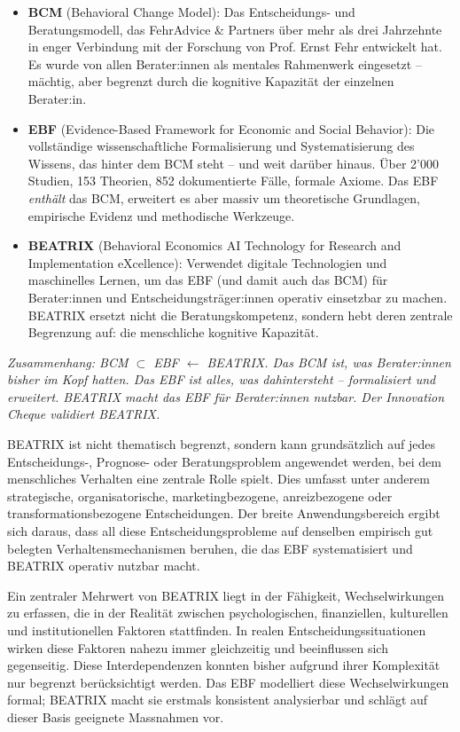\documentclass[11pt,a4paper]{article}
\begin{document}
\begin{itemize}[nosep]
    \item \textbf{BCM} (Behavioral Change Model): Das Entscheidungs- und Beratungsmodell, das FehrAdvice \& Partners über mehr als drei Jahrzehnte in enger Verbindung mit der Forschung von Prof. Ernst Fehr entwickelt hat. Es wurde von allen Berater:innen als mentales Rahmenwerk eingesetzt -- mächtig, aber begrenzt durch die kognitive Kapazität der einzelnen Berater:in.
    \item \textbf{EBF} (Evidence-Based Framework for Economic and Social Behavior): Die vollständige wissenschaftliche Formalisierung und Systematisierung des Wissens, das hinter dem BCM steht -- und weit darüber hinaus. Über 2'000 Studien, 153 Theorien, 852 dokumentierte Fälle, formale Axiome. Das EBF \emph{enthält} das BCM, erweitert es aber massiv um theoretische Grundlagen, empirische Evidenz und methodische Werkzeuge.
    \item \textbf{BEATRIX} (Behavioral Economics AI Technology for Research and Implementation eXcellence): Verwendet digitale Technologien und maschinelles Lernen, um das EBF (und damit auch das BCM) für Berater:innen und Entscheidungsträger:innen operativ einsetzbar zu machen. BEATRIX ersetzt nicht die Beratungskompetenz, sondern hebt deren zentrale Begrenzung auf: die menschliche kognitive Kapazität.
\end{itemize}

\noindent\textit{Zusammenhang: BCM $\subset$ EBF $\leftarrow$ BEATRIX. Das BCM ist, was Berater:innen bisher im Kopf hatten. Das EBF ist alles, was dahintersteht -- formalisiert und erweitert. BEATRIX macht das EBF für Berater:innen nutzbar. Der Innovation Cheque validiert BEATRIX.}

\vspace{0.5cm}

BEATRIX ist nicht thematisch begrenzt, sondern kann grundsätzlich auf jedes Entscheidungs-, Prognose- oder Beratungsproblem angewendet werden, bei dem menschliches Verhalten eine zentrale Rolle spielt. Dies umfasst unter anderem strategische, organisatorische, marketingbezogene, anreizbezogene oder transformationsbezogene Entscheidungen. Der breite Anwendungsbereich ergibt sich daraus, dass all diese Entscheidungsprobleme auf denselben empirisch gut belegten Verhaltensmechanismen beruhen, die das EBF systematisiert und BEATRIX operativ nutzbar macht.

Ein zentraler Mehrwert von BEATRIX liegt in der Fähigkeit, Wechselwirkungen zu erfassen, die in der Realität zwischen psychologischen, finanziellen, kulturellen und institutionellen Faktoren stattfinden. In realen Entscheidungssituationen wirken diese Faktoren nahezu immer gleichzeitig und beeinflussen sich gegenseitig. Diese Interdependenzen konnten bisher aufgrund ihrer Komplexität nur begrenzt berücksichtigt werden. Das EBF modelliert diese Wechselwirkungen formal; BEATRIX macht sie erstmals konsistent analysierbar und schlägt auf dieser Basis geeignete Massnahmen vor.
\end{document}

